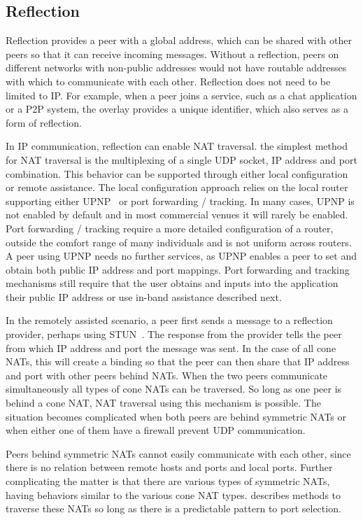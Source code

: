 \documentclass[conference]{IEEEtran}
\begin{document}
\subsection{Reflection}
\label{reflection}

Reflection provides a peer with a global address, which can be shared with
other peers so that it can receive incoming messages.  Without a reflection,
peers on different networks with non-public addresses would not have routable
addresses with which to communicate with each other.  Reflection does not need
to be limited to IP.  For example, when a peer joins a service, such as a chat
application or a P2P system, the overlay provides a unique identifier, which
also serves as a form of reflection.

In IP communication, reflection can enable NAT traversal.  the simplest method
for NAT traversal is the multiplexing of a single UDP socket, IP address and
port combination.  This behavior can be supported through either local
configuration or remote assistance.  The local configuration approach relies on
the local router supporting either UPNP~\cite{upnp} or port forwarding /
tracking.  In many cases, UPNP is not enabled by default and in most commercial
venues it will rarely be enabled.  Port forwarding / tracking require a more
detailed configuration of a router, outside the comfort range of many
individuals and is not uniform across routers.  A peer using UPNP needs no
further services, as UPNP enables a peer to set and obtain both public IP
address and port mappings.  Port forwarding and tracking mechanisms still
require that the user obtains and inputs into the application their public IP
address or use in-band assistance described next.

In the remotely assisted scenario, a peer first sends a message to a reflection
provider, perhaps using STUN~\cite{stun_rfc}.  The response from the provider
tells the peer from which IP address and port the message was sent.  In the
case of all cone NATs, this will create a binding so that the peer can then
share that IP address and port with other peers behind NATs.  When the two
peers communicate simultaneously all types of cone NATs can be traversed.  So
long as one peer is behind a cone NAT, NAT traversal using this mechanism is
possible.  The situation becomes complicated when both peers are behind
symmetric NATs or when either one of them have a firewall prevent UDP
communication.  

Peers behind symmetric NATs cannot easily communicate with each other, since
there is no relation between remote hosts and ports and local ports.  Further
complicating the matter is that there are various types of symmetric NATs,
having behaviors similar to the various cone NAT types.  \cite{ice} describes
methods to traverse these NATs so long as there is a predictable pattern to
port selection.  
\end{document}
